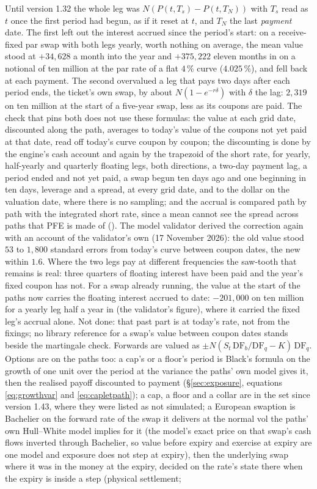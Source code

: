 \documentclass[11pt,a4paper]{article}
\newcommand{\code}[1]{\ifmmode\text{\small\texttt{\detokenize{#1}}}\else{\small\path{#1}}\fi}
\begin{document}
Until version 1.32 the whole leg was $N(P(t,T_s)-P(t,T_N))$ with $T_s$ read as $t$ once the first period had begun, as if it reset at $t$, and $T_N$ the last \emph{payment} date. The first left out the interest accrued since the period's start: on a receive-fixed par swap with both legs yearly, worth nothing on average, the mean value stood at $+34{,}628$ a month into the year and $+375{,}222$ eleven months in on a notional of ten million at the par rate of a flat $4\,\%$ curve ($4.025\,\%$), and fell back at each payment. The second overvalued a leg that pays two days after each period ends, the ticket's own swap, by about $N(1-e^{-r\delta})$ with $\delta$ the lag: $2{,}319$ on ten million at the start of a five-year swap, less as its coupons are paid. The check that pins both does not use these formulas: the value at each grid date, discounted along the path, averages to today's value of the coupons not yet paid at that date, read off today's curve coupon by coupon; the discounting is done by the engine's cash account and again by the trapezoid of the short rate, for yearly, half-yearly and quarterly floating legs, both directions, a two-day payment lag, a period ended and not yet paid, a swap begun ten days ago and one beginning in ten days, leverage and a spread, at every grid date, and to the dollar on the valuation date, where there is no sampling; and the accrual is compared path by path with the integrated short rate, since a mean cannot see the spread across paths that PFE is made of (\code{tests/test\_ccr.py}). The model validator derived the correction again with an account of the validator's own (17 November 2026): the old value stood $53$ to $1{,}800$ standard errors from today's curve between coupon dates, the new within $1.6$. Where the two legs pay at different frequencies the saw-tooth that remains is real: three quarters of floating interest have been paid and the year's fixed coupon has not. For a swap already running, the value at the start of the paths now carries the floating interest accrued to date: $-201{,}000$ on ten million for a yearly leg half a year in (the validator's figure), where it carried the fixed leg's accrual alone. Not done: that past part is at today's rate, not from the fixings; no library reference for a swap's value between coupon dates stands beside the martingale check. Forwards are valued as $\pm N(S_t\,\mathrm{DF}_b/\mathrm{DF}_q-K)\,\mathrm{DF}_q$. Options are on the paths too: a cap's or a floor's period is Black's formula on the growth of one unit over the period at the variance the paths' own model gives it, then the realised payoff discounted to payment (\S\ref{sec:exposure}, equations \eqref{eq:growthvar} and \eqref{eq:capletpath}); a cap, a floor and a collar are in the set since version 1.43, where they were listed as not simulated; a European swaption is Bachelier on the forward rate of the swap it delivers at the normal vol the paths' own Hull--White model implies for it (the model's exact price on that swap's cash flows inverted through Bachelier, so value before expiry and exercise at expiry are one model and exposure does not step at expiry), then the underlying swap where it was in the money at the expiry, decided on the rate's state there when the expiry is inside a step (physical settlement; 
\end{document}
